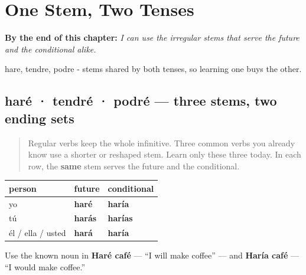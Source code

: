 
\chapter{One Stem, Two Tenses}
\label{ch:spanish-future-conditional-stems}

\begin{chapteropening}
\textbf{By the end of this chapter:} \emph{I can use the irregular stems that serve the future and the conditional alike.}

hare, tendre, podre - stems shared by both tenses, so learning one buys the other.
\end{chapteropening}

\section[haré · tendré · podré]{haré · tendré · podré — three stems, two ending sets}

\label{lesson:ES-C17-irregulares}



\begin{quote}
Regular verbs keep the whole infinitive. Three common verbs you already know use a shorter or reshaped stem. Learn only these three today. In each row, the \textbf{same} stem serves the future and the conditional.
\end{quote}

\begin{grammarlens}[title={Grammar Lens: hacer becomes har-}]
\noindent
\begin{tabularx}{\linewidth}{@{}>{\raggedright\arraybackslash}X>{\raggedright\arraybackslash}X>{\raggedright\arraybackslash}X@{}}
\toprule
\textbf{person} & \textbf{future} & \textbf{conditional} \\
\midrule
yo & \textbf{haré} & \textbf{haría} \\
tú & \textbf{harás} & \textbf{harías} \\
él / ella / usted & \textbf{hará} & \textbf{haría} \\
\bottomrule
\end{tabularx}

Use the known noun in \textbf{Haré café} — “I will make coffee” — and \textbf{Haría café} — “I would make coffee.”
\end{grammarlens}

